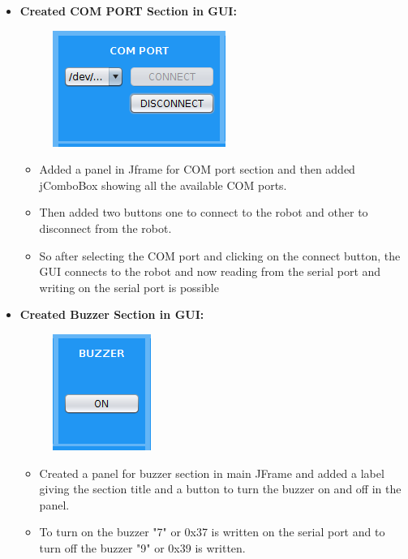 \documentclass[a4paper,12pt,oneside]{book}
\begin{document}
\begin{enumerate}
\begin{itemize}
			\item \textbf{Created COM PORT Section in GUI:}
			\begin{figure}[h]
				\begin{center}
					\includegraphics[scale=1]{comport.png}
				\end{center}
			\end{figure}
			\begin{itemize}
				\item Added a panel in Jframe for COM port section and then added jComboBox showing all the available COM ports.
				\item Then added two buttons one to connect to the robot and other to disconnect from the robot.
				\item So after selecting the COM port and clicking on the connect button, the GUI connects to the robot and now reading from the serial port and writing on the serial port is possible
			\end{itemize}
			\newpage
			\item \textbf{Created Buzzer Section in GUI:}
			\begin{figure}[h]
				\begin{center}
					\includegraphics[scale=1]{buzzer.png}
				\end{center}
			\end{figure}
			\begin{itemize}
				\item Created a panel for buzzer section in main JFrame and added a label giving the section title and a button to turn the buzzer on and off in the panel.
				\item To turn on the buzzer "7" or 0x37 is written on the serial port and to turn off the buzzer "9" or 0x39 is written.   

\end{itemize}
\end{itemize}
\end{enumerate}
\end{document}

